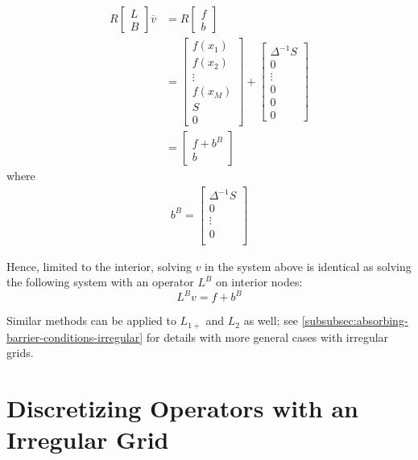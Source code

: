 \documentclass[11pt]{article}
\theoremstyle{definition}
\begin{document}
\begin{align}
R\begin{bmatrix}
 L \\
 B
\end{bmatrix} 
\overline{v}
&= 
R\begin{bmatrix}
f \\
b
\end{bmatrix} \\
 &= \begin{bmatrix}
 f(x_1) \\
 f(x_2) \\
 \vdots \\
 f(x_M) \\
 S \\
 0
\end{bmatrix} +
\begin{bmatrix}
\Delta^{-1}S \\
0  \\
\vdots \\ 
0 \\
0 \\
0
\end{bmatrix} \\
&= \begin{bmatrix}
f + b^B \\
b
\end{bmatrix}
\end{align}
where 
\begin{align}
b^B = 
\begin{bmatrix}
\Delta^{-1}S \\
0  \\
\vdots \\ 
0 \\
\end{bmatrix}
\end{align}

Hence, limited to the interior, solving $v$ in the system above is identical as solving the following system with an operator $L^B$ on interior nodes:
\begin{equation}
L^Bv= f+ b^B
\end{equation}

Similar methods can be applied to $L_{1+}$ and $L_2$ as well; see \ref{subsubsec:absorbing-barrier-conditions-irregular} for details with more general cases with irregular grids.

\section{Discretizing Operators with an Irregular Grid}
\end{document}
